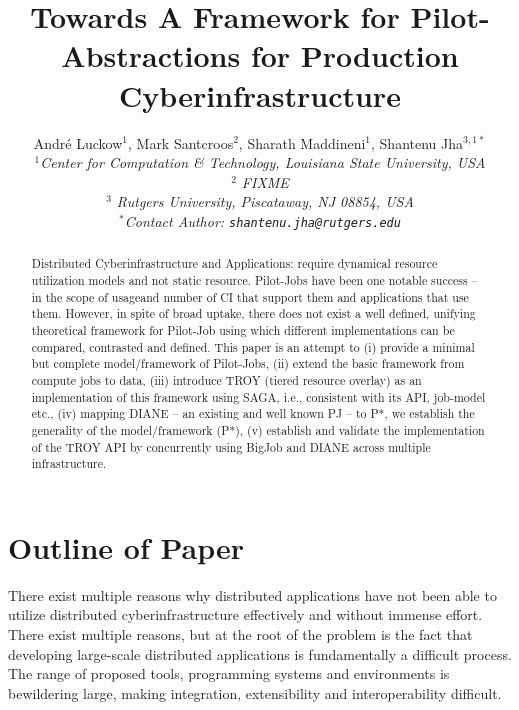 \documentclass[conference,final]{IEEEtran}
\title{Towards A Framework for Pilot-Abstractions for Production
  Cyberinfrastructure}
\date{}
\newcommand{\up}{\vspace*{-1em}}
\begin{document}
\ifpdf
{}
\else
{}
\fi

\author{
  Andr\'e Luckow$^{1}$, Mark Santcroos$^{2}$, Sharath Maddineni$^{1}$, Shantenu Jha$^{3,1*}$\\
  \small{\emph{$^{1}$Center for Computation \& Technology, Louisiana State University, USA}}\\
 \small{\emph{$^{2}$ FIXME}}\\
 \small{\emph{$^{3}$ Rutgers University, Piscataway, NJ 08854, USA}}\\
  \small{\emph{$^{*}$Contact Author: \texttt{shantenu.jha@rutgers.edu}}}\\
  \up\up\up\up }

\maketitle

\begin{abstract}
  Distributed Cyberinfrastructure and Applications: require dynamical
  resource utilization models and not static resource.  Pilot-Jobs
  have been one notable success -- in the scope of usageand number of
  CI that support them and applications that use them.  However, in
  spite of broad uptake, there does not exist a well defined, unifying
  theoretical framework for Pilot-Job using which different
  implementations can be compared, contrasted and defined. This paper
  is an attempt to (i) provide a minimal but complete model/framework
  of Pilot-Jobs, (ii) extend the basic framework from compute jobs to
  data, (iii) introduce TROY (tiered resource overlay) as an
  implementation of this framework using SAGA, i.e., consistent with
  its API, job-model etc., (iv) mapping DIANE -- an existing and well
  known PJ -- to P*, we establish the generality of the
  model/framework (P*), (v) establish and validate the implementation
  of the TROY API by concurrently using BigJob and DIANE across
  multiple infrastructure.
\end{abstract}

\section*{Outline of Paper}
There exist multiple reasons why distributed applications have not
been able to utilize distributed cyberinfrastructure effectively and
without immense effort\cite{dpa_surveypaper}.  There exist multiple
reasons, but at the root of the problem is the fact that developing
large-scale distributed applications is fundamentally a difficult
process. The range of proposed tools, programming systems and
environments is bewildering large, making integration, extensibility
and interoperability difficult.  
\end{document}
